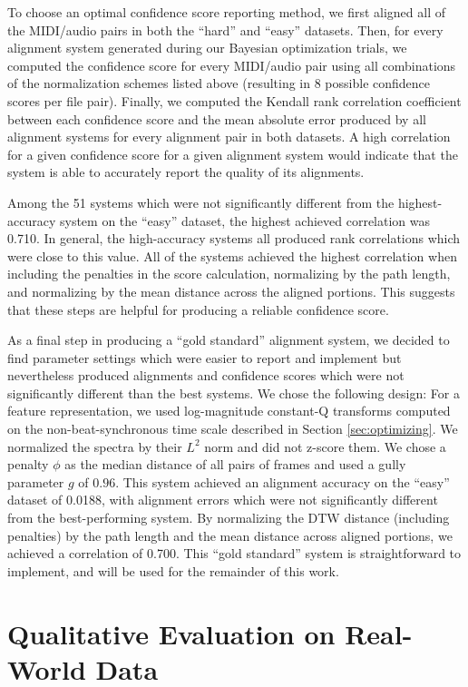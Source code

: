 \documentclass{article}
\begin{document}
To choose an optimal confidence score reporting method, we first aligned all of the MIDI/audio pairs in both the ``hard'' and ``easy'' datasets.
Then, for every alignment system generated during our Bayesian optimization trials, we computed the confidence score for every MIDI/audio pair using all combinations of the normalization schemes listed above (resulting in 8 possible confidence scores per file pair).
Finally, we computed the Kendall rank correlation coefficient \cite{kendall1938new} between each confidence score and the mean absolute error produced by all alignment systems for every alignment pair in both datasets.
A high correlation for a given confidence score for a given alignment system would indicate that the system is able to accurately report the quality of its alignments.

Among the 51 systems which were not significantly different from the highest-accuracy system on the ``easy'' dataset, the highest achieved correlation was 0.710.
In general, the high-accuracy systems all produced rank correlations which were close to this value.
All of the systems achieved the highest correlation when including the penalties in the score calculation, normalizing by the path length, and normalizing by the mean distance across the aligned portions.
This suggests that these steps are helpful for producing a reliable confidence score.

As a final step in producing a ``gold standard'' alignment system, we decided to find parameter settings which were easier to report and implement but nevertheless produced alignments and confidence scores which were not significantly different than the best systems.
We chose the following design: For a feature representation, we used log-magnitude constant-Q transforms computed on the non-beat-synchronous time scale described in Section \ref{sec:optimizing}.
We normalized the spectra by their $L^2$ norm and did not z-score them.
We chose a penalty $\phi$ as the median distance of all pairs of frames and used a gully parameter $g$ of $0.96$.
This system achieved an alignment accuracy on the ``easy'' dataset of 0.0188, with alignment errors which were not significantly different from the best-performing system.
By normalizing the DTW distance (including penalties) by the path length and the mean distance across aligned portions, we achieved a correlation of 0.700.
This ``gold standard'' system is straightforward to implement, and will be used for the remainder of this work.

\section{Qualitative Evaluation on Real-World Data}
\label{sec:qualitative}
\end{document}
